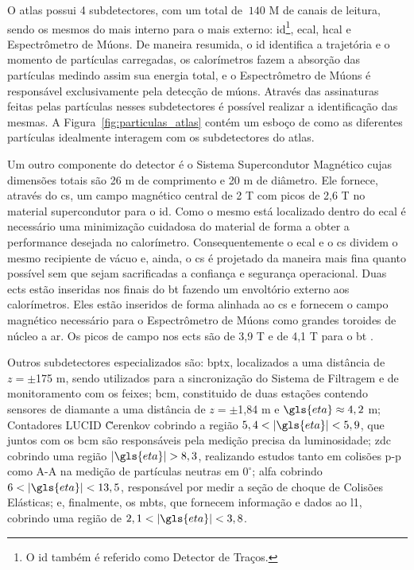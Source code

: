 O \gls{atlas} possui 4 subdetectores, com um total de $~140$ M de canais de
leitura, sendo os mesmos do mais interno para o mais externo: 
\gls{id}\footnote{O \gls{id} também é referido como Detector de Traços.}, \gls{ecal}, 
\gls{hcal} e Espectrômetro de Múons. De maneira resumida, o \gls{id} identifica a
trajetória e o momento de partículas carregadas, os calorímetros fazem a
absorção das partículas medindo assim sua energia total, e o Espectrômetro de
Múons é responsável exclusivamente pela detecção de múons.
Através das assinaturas feitas pelas partículas nesses 
subdetectores é possível realizar a identificação das mesmas. 
A Figura~\ref{fig:particulas_atlas} contém um esboço de como as diferentes 
partículas idealmente interagem com os subdetectores do \gls{atlas}. 

Um outro componente do detector é o Sistema Supercondutor Magnético cujas
dimensões totais são 26 m de comprimento e 20 m de diâmetro. 
Ele fornece, através do \gls{cs}, um campo magnético central de 2 T com picos de 2,6 T 
no material supercondutor para o \gls{id}. Como o mesmo está
localizado dentro do \gls{ecal} é necessário uma minimização cuidadosa do
material de forma a obter a performance desejada no calorímetro. 
Consequentemente o \gls{ecal} e o \gls{cs} dividem o mesmo recipiente de vácuo e,
ainda, o \gls{cs} é projetado da maneira mais fina quanto possível sem que sejam
sacrificadas a confiança e segurança operacional.
Duas \glspl{ect} estão inseridas nos finais do \gls{bt} fazendo um
envoltório externo aos calorímetros. Eles estão inseridos de forma alinhada ao \gls{cs} 
e fornecem o campo magnético necessário para o Espectrômetro de Múons como grandes toroides 
de núcleo a ar. Os picos de campo nos \glspl{ect} são de
3,9 T e de 4,1 T para o \gls{bt} \cite{ATLAS_TDR}.

Outros subdetectores especializados são: \gls{bptx}, localizados a uma distância
de $z = \pm$175 m, sendo utilizados para a sincronização do Sistema de Filtragem e de 
monitoramento com os feixes; \gls{bcm}, constituido de duas estações contendo
sensores de diamante a uma distância de $z = \pm$1,84 m e $\gls{eta} \approx
4,2$ m; Contadores LUCID \~Cerenkov cobrindo a região $5,4 < |\gls{eta}| < 5,9$, que
juntos com os \gls{bcm} são responsáveis pela medição precisa da luminosidade;
\gls{zdc} cobrindo uma região $|\gls{eta}|>8,3$, realizando estudos tanto em
colisões p-p como A-A na medição de partículas neutras em $0^{\circ}$;
\gls{alfa} cobrindo $6<|\gls{eta}|<13,5$, responsável por medir a seção de
choque de Colisões Elásticas; e, finalmente, os \gls{mbts}, que fornecem
informação e dados ao \glsdesc{l1}, cobrindo uma região de $2,1
< |\gls{eta}| < 3,8$.

